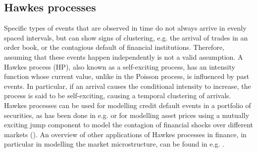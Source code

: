 \documentclass[10pt]{article}
\theoremstyle{plain}
\theoremstyle{definition}
\newcommand{\<}{\langle}
\renewcommand{\>}{\rangle}
\renewcommand{\(}{\left(}
\renewcommand{\)}{\right)}
\renewcommand{\[}{\left[}
\renewcommand{\]}{\right]}
\begin{document}
\subsection{Hawkes processes}\label{sec21}
Specific types of events that are observed in time do not always arrive in evenly spaced intervals, but can show signs of clustering, e.g. the arrival of trades in an order book, or the contagious default of financial institutions. Therefore, assuming that these events happen independently is not a valid assumption. A Hawkes process (HP), also known as a self-exciting process, has an intensity function whose current value, unlike in the Poisson process, is influenced by past events. In particular, if an arrival causes the conditional intensity to increase, the process is said to be self-exciting, causing a temporal clustering of arrivals. Hawkes processes can be used for modelling credit default events in a portfolio of securities, as has been done in e.g. \citet{errais10} or for modelling asset prices using a mutually exciting jump component to model the contagion of financial shocks over different markets (\citet{ait15}). An overview of other applications of Hawkes processes in finance, in particular in modelling the market microstructure, can be found in e.g. \citet{bacry15}.
\end{document}
